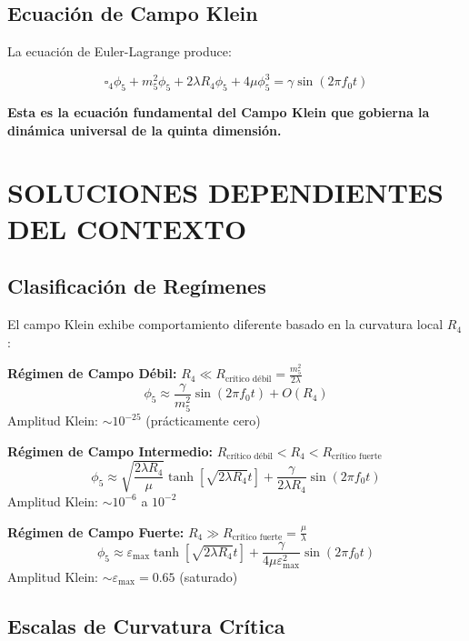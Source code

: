 \documentclass[12pt,a4paper]{article}
\begin{document}
\subsection{Ecuación de Campo Klein}

La ecuación de Euler-Lagrange produce:

\begin{equation}
\boxed{
\square_4\phi_5 + m_5^2\phi_5 + 2\lambda R_4\phi_5 + 4\mu\phi_5^3 = \gamma \sin(2\pi f_0 t)
}
\end{equation}

\textbf{Esta es la ecuación fundamental del Campo Klein que gobierna la dinámica universal de la quinta dimensión.}

\section{SOLUCIONES DEPENDIENTES DEL CONTEXTO}

\subsection{Clasificación de Regímenes}

El campo Klein exhibe comportamiento diferente basado en la curvatura local $R_4$:

\textbf{Régimen de Campo Débil:} $R_4 \ll R_{\text{crítico débil}} = \frac{m_5^2}{2\lambda}$
\begin{equation}
\phi_5 \approx \frac{\gamma}{m_5^2} \sin(2\pi f_0 t) + O(R_4)
\end{equation}
Amplitud Klein: $\sim 10^{-25}$ (prácticamente cero)

\textbf{Régimen de Campo Intermedio:} $R_{\text{crítico débil}} < R_4 < R_{\text{crítico fuerte}}$
\begin{equation}
\phi_5 \approx \sqrt{\frac{2\lambda R_4}{\mu}} \tanh[\sqrt{2\lambda R_4}t] + \frac{\gamma}{2\lambda R_4} \sin(2\pi f_0 t)
\end{equation}
Amplitud Klein: $\sim 10^{-6}$ a $10^{-2}$

\textbf{Régimen de Campo Fuerte:} $R_4 \gg R_{\text{crítico fuerte}} = \frac{\mu}{\lambda}$
\begin{equation}
\phi_5 \approx \varepsilon_{\max} \tanh[\sqrt{2\lambda R_4}t] + \frac{\gamma}{4\mu\varepsilon_{\max}^2} \sin(2\pi f_0 t)
\end{equation}
Amplitud Klein: $\sim \varepsilon_{\max} = 0.65$ (saturado)

\subsection{Escalas de Curvatura Crítica}
\end{document}
